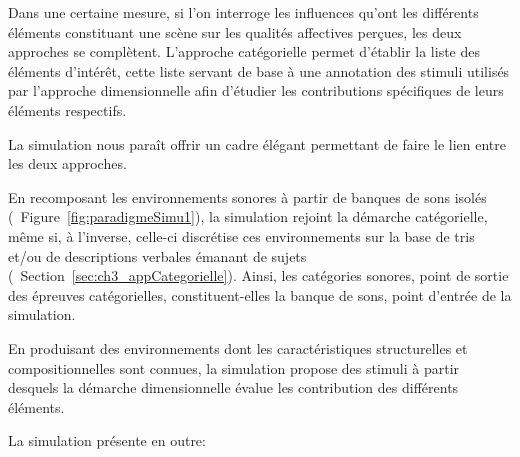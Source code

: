 Dans une certaine mesure, si l'on interroge les influences qu'ont les différents éléments constituant une scène sur les qualités affectives perçues, les deux approches se complètent. L'approche catégorielle permet d'établir la liste des éléments d'intérêt, cette liste servant de base à une annotation des stimuli utilisés par l'approche dimensionnelle afin d'étudier les contributions spécifiques de leurs éléments respectifs.

La simulation nous paraît offrir un cadre élégant permettant de faire le lien entre les deux approches.

En recomposant les environnements sonores à partir de banques de sons isolés (\cf~Figure~\ref{fig:paradigmeSimu1}), la simulation rejoint la démarche catégorielle, même si, à l'inverse, celle-ci discrétise ces environnements sur la base de tris et/ou de descriptions verbales émanant de sujets (\cf~Section~\ref{sec:ch3_appCategorielle}). Ainsi, les catégories sonores, point de sortie des épreuves catégorielles, constituent-elles la banque de sons, point d'entrée de la simulation.

En produisant des environnements dont les caractéristiques structurelles et compositionnelles sont connues, la simulation propose des stimuli à partir desquels la démarche dimensionnelle évalue les contribution des différents éléments.

La simulation présente en outre:

